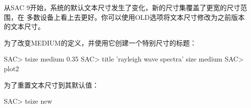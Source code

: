 从SAC 9开始，系统的默认文本尺寸发生了变化，新的尺寸集覆盖了更宽的尺寸范围，在
多数设备上看上去更好。你可以使用OLD选项将文本尺寸修改为之前版本的文本尺寸。

为了改变MEDIUM的定义，并使用它创建一个特别尺寸的标题：
\begin{SACCode}
SAC> tsize medium 0.35
SAC> title 'rayleigh wave spectra' size medium
SAC> plot2
\end{SACCode}

为了重置文本尺寸到其默认值：
\begin{SACCode}
SAC> tsize new
\end{SACCode}
